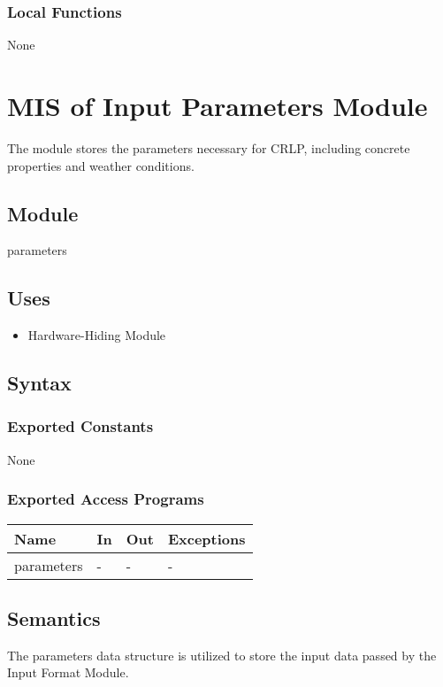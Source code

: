 \documentclass[12pt, titlepage]{article}
\begin{document}
\subsubsection{Local Functions}
None
\newpage
\section{MIS of Input Parameters Module}
The module stores the parameters necessary for CRLP, including concrete properties and weather conditions.

\subsection{Module}
parameters

\subsection{Uses}
\begin{itemize}
    \item Hardware-Hiding Module
\end{itemize}

\subsection{Syntax}

\subsubsection{Exported Constants}
None
\subsubsection{Exported Access Programs}

\begin{center}
\begin{tabular}{p{2cm} p{4cm} p{4cm} p{2cm}}
\hline
\textbf{Name} & \textbf{In} & \textbf{Out} & \textbf{Exceptions} \\
\hline
parameters & - & - & - \\
\hline
\end{tabular}
\end{center}

\subsection{Semantics}
The parameters data structure is utilized to store the input data passed by the Input Format Module.
\end{document}
